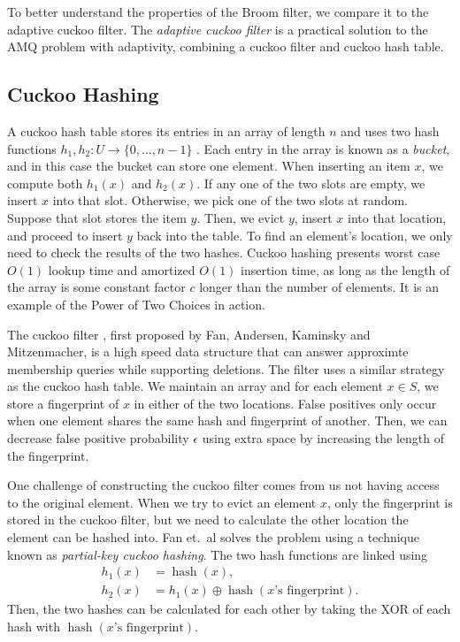 \documentclass[../paper.tex]{subfiles}
\begin{document}
\newcommand{\on}{\operatorname}
To better understand the properties of the Broom filter, we compare it to the adaptive cuckoo filter.
The \emph{adaptive cuckoo filter} \cite{adaptive-cuckoo} is a practical solution to the AMQ problem with adaptivity, combining a cuckoo filter and cuckoo hash table.

\subsection{Cuckoo Hashing}
A cuckoo hash table stores its entries in an array of length $n$ and uses two hash functions $h_1,h_2:U\to \{0,\ldots,n-1\}$ \cite{prob-textbook}.
Each entry in the array is known as a \emph{bucket}, and in this case the bucket can store one element. When inserting an item $x$, we compute both $h_1(x)$ and $h_2(x)$. If any one of the two slots are empty, we insert $x$ into that slot.
Otherwise, we pick one of the two slots at random. Suppose that slot stores the item $y$. Then, we evict $y$, insert $x$ into that location,
and proceed to insert $y$ back into the table. To find an element's location, we only need to check the results of the two hashes.
Cuckoo hashing presents worst case $O(1)$ lookup time and amortized $O(1)$ insertion time, as long as the length of the array is some constant factor $c$ longer
than the number of elements. It is an example of the Power of Two Choices in action.

The cuckoo filter \cite{cuckoo-filter}, first proposed by Fan, Andersen, Kaminsky and Mitzenmacher, is a high speed data structure that can answer approximte membership queries while supporting deletions.
The filter uses a similar strategy as the cuckoo hash table. We maintain an array and for each element $x\in S$, we store a fingerprint of $x$ in either of the two locations. False positives only occur when one element shares the same hash and fingerprint of another. Then, we can decrease false positive probability $\epsilon$ using extra space by increasing the length of the fingerprint.

One challenge of constructing the cuckoo filter comes from us not having access to the original element. When we try to evict an element $x$, only the fingerprint
is stored in the cuckoo filter, but we need to calculate the other location the element can be hashed into. Fan et.\ al solves the problem using a technique known as \emph{partial-key cuckoo hashing}.
The two hash functions are linked using \begin{align*}
    h_1(x)&=\on{hash}(x), \\ h_2(x)&=h_1(x)\oplus \on{hash}(x\text{'s fingerprint}).
\end{align*} Then, the two hashes can be calculated for each other by taking the XOR of each hash with $\on{hash}(x\text{'s fingerprint})$.
\end{document}
